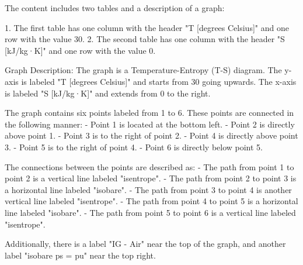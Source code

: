 The content includes two tables and a description of a graph:

1. The first table has one column with the header "T [degrees Celsius]" and one row with the value 30.
2. The second table has one column with the header "S [kJ/kg·K]" and one row with the value 0.

Graph Description:
The graph is a Temperature-Entropy (T-S) diagram. The y-axis is labeled "T [degrees Celsius]" and starts from 30 going upwards. The x-axis is labeled "S [kJ/kg·K]" and extends from 0 to the right.

The graph contains six points labeled from 1 to 6. These points are connected in the following manner:
- Point 1 is located at the bottom left.
- Point 2 is directly above point 1.
- Point 3 is to the right of point 2.
- Point 4 is directly above point 3.
- Point 5 is to the right of point 4.
- Point 6 is directly below point 5.

The connections between the points are described as:
- The path from point 1 to point 2 is a vertical line labeled "isentrope".
- The path from point 2 to point 3 is a horizontal line labeled "isobare".
- The path from point 3 to point 4 is another vertical line labeled "isentrope".
- The path from point 4 to point 5 is a horizontal line labeled "isobare".
- The path from point 5 to point 6 is a vertical line labeled "isentrope".

Additionally, there is a label "IG - Air" near the top of the graph, and another label "isobare ps = pu" near the top right.